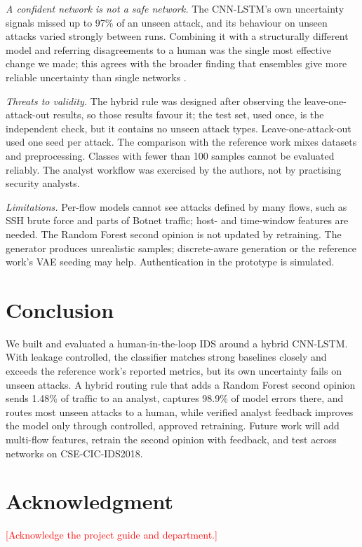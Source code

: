 \documentclass[conference]{IEEEtran}
\newcommand{\todo}[1]{\textcolor{red}{[#1]}}
\begin{document}
\textit{A confident network is not a safe network.} The CNN-LSTM's own uncertainty signals missed
up to 97\% of an unseen attack, and its behaviour on unseen attacks varied strongly between runs.
Combining it with a structurally different model and referring disagreements to a human was the
single most effective change we made; this agrees with the broader finding that ensembles give
more reliable uncertainty than single networks \cite{lakshminarayanan2017simple}.

\textit{Threats to validity.} The hybrid rule was designed after observing the
leave-one-attack-out results, so those results favour it; the test set, used once, is the
independent check, but it contains no unseen attack types. Leave-one-attack-out used one seed per
attack. The comparison with the reference work mixes datasets and preprocessing. Classes with fewer
than 100 samples cannot be evaluated reliably. The analyst workflow was exercised by the authors,
not by practising security analysts.

\textit{Limitations.} Per-flow models cannot see attacks defined by many flows, such as SSH brute
force and parts of Botnet traffic; host- and time-window features are needed. The Random Forest
second opinion is not updated by retraining. The generator produces unrealistic samples;
discrete-aware generation or the reference work's VAE seeding may help. Authentication in the
prototype is simulated.

\section{Conclusion}
We built and evaluated a human-in-the-loop IDS around a hybrid CNN-LSTM. With leakage controlled,
the classifier matches strong baselines closely and exceeds the reference work's reported
metrics, but its own uncertainty fails on unseen attacks. A hybrid routing rule that adds a
Random Forest second opinion sends 1.48\% of traffic to an analyst, captures 98.9\% of model
errors there, and routes most unseen attacks to a human, while verified analyst feedback improves
the model only through controlled, approved retraining. Future work will add multi-flow features,
retrain the second opinion with feedback, and test across networks on CSE-CIC-IDS2018.

\section*{Acknowledgment}
\todo{Acknowledge the project guide and department.}
\end{document}
